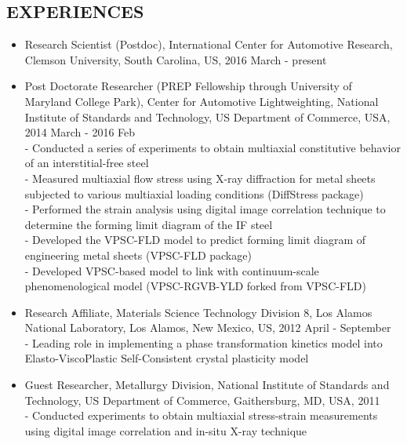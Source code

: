 \documentclass{res}
\begin{document}
\begin{resume}
  \section{EXPERIENCES}
  \begin{itemize}
  \item Research Scientist (Postdoc), International Center for Automotive Research, Clemson University, South Carolina, US, 2016 March - present
  \item Post Doctorate Researcher (PREP Fellowship through University of Maryland College Park), Center for Automotive Lightweighting,
    National Institute of Standards and Technology, US Department of Commerce, USA, 2014 March - 2016 Feb\\
    - Conducted a series of experiments to obtain multiaxial constitutive behavior of an interstitial-free steel\\
    - Measured multiaxial flow stress using X-ray diffraction for metal sheets subjected to various multiaxial loading conditions (DiffStress package)\\
    - Performed the strain analysis using digital image correlation technique to determine the forming limit diagram of the IF steel\\
    - Developed the VPSC-FLD model to predict forming limit diagram of engineering metal sheets (VPSC-FLD package)\\
    - Developed VPSC-based model to link with continuum-scale phenomenological model (VPSC-RGVB-YLD forked from VPSC-FLD)
  \item Research Affiliate, Materials Science Technology Division 8, Los Alamos National Laboratory, Los Alamos, New Mexico, US, 2012 April - September \\
    - Leading role in implementing a phase transformation kinetics model into Elasto-ViscoPlastic Self-Consistent crystal plasticity model
  \item Guest Researcher, Metallurgy Division, National Institute of Standards and Technology, US Department of Commerce, Gaithersburg, MD, USA, 2011\\
    - Conducted experiments to obtain multiaxial stress-strain measurements using digital image correlation and in-situ X-ray technique
  \end{itemize}


\end{resume}
\end{document}
